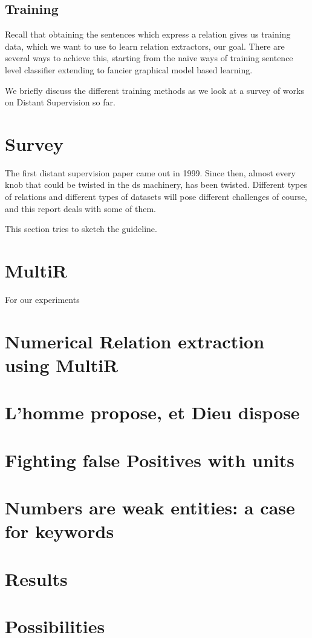 \documentclass[a4paper,10pt]{article}
\begin{document}
\subsection{Training}
Recall that obtaining the sentences which express a relation gives us training data, which 
we want to use to learn relation extractors, our goal.
There are several ways to achieve this, starting from the naive ways of training sentence 
level classifier extending to fancier graphical model based learning.

We briefly discuss the different training methods as we look at a survey of works on Distant Supervision
so far.

\section{Survey}

The first distant supervision paper came out in 1999.
Since then, almost every knob that could be twisted in the ds machinery, has been 
twisted. Different types of relations and different types of datasets will pose different challenges
of course, and this report deals with some of them.

This section tries to sketch the guideline.



\section{MultiR}
For our experiments

\section{Numerical Relation extraction using MultiR}

\section{L'homme propose, et Dieu dispose}

\section{Fighting false Positives with units}

\section{Numbers are weak entities: a case for keywords}

\section{Results}

\section{Possibilities}



\end{document}
